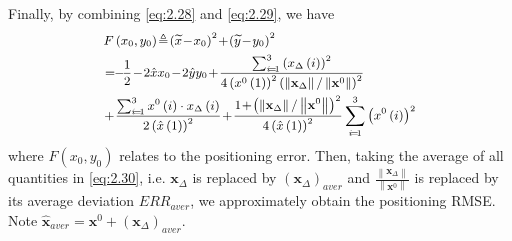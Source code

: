\documentclass[journal]{IEEEtran}
\begin{document}
Finally, by combining \eqref{eq:2.28} and \eqref{eq:2.29}, we have
\begin{equation}\label{eq:2.30}
   \begin{small}
   \begin{aligned}
      \hspace{-7mm}
      & F\left(x_0,y_0\right)\!\triangleq\!\left(\widetilde{x}\!-\!x_0\right)^2\!+\!\left(\widetilde{y}\!-\!y_0\right)^2 \\
      & \!=\! \!-\!\frac12\!-\!2\hat{x}x_0\!-\!2\hat{y}y_0\!+\!\frac{\sum_{i\!=\!1}^3\left(x_{\Delta}\left(i\right)\right)^2}{4\left(x^0\left(1\right)\right)^2\left(\left\|\mathbf{x}_\Delta\right\|/\left\|\mathbf{x}^0\right\|\right)^2}\\
      &\!+\!\frac{\sum_{i\!=\!1}^3 x^0\left(i\right)\cdot x_\Delta\left(i\right)}{2\left(\hat{x}\left(1\right)\right)^2}\!+\!\frac{1\!+\!\left(\left\|\mathbf{x}_\Delta\right\|/\left\|\mathbf{x}^0\right\|\right)^2}{4\left(\hat{x}\left(1\right)\right)^2}\sum_{i\!=\!1}^3\left(x^0\left(i\right)\right)^2
   \end{aligned}
\end{small}
  \end{equation}
where $F\left(x_0,y_0\right)$ relates to the positioning error. Then, taking the average of all quantities in \eqref{eq:2.30}, i.e. $\mathbf{x}_{\Delta}$ is replaced by $\left(\mathbf{x}_{\Delta}\right)_{aver}$ and  $\frac{\left\|{\mathbf{x}_{\Delta}}\right\|}{\left\|{\mathbf{x}^0}\right\|}$ is replaced by its average deviation ${ERR}_{aver}$, we approximately obtain the positioning RMSE. Note $\hat{\mathbf{x}}_{aver}=\mathbf{x}^0+\left(\mathbf{x}_{\Delta}\right)_{aver}$.
\end{document}
